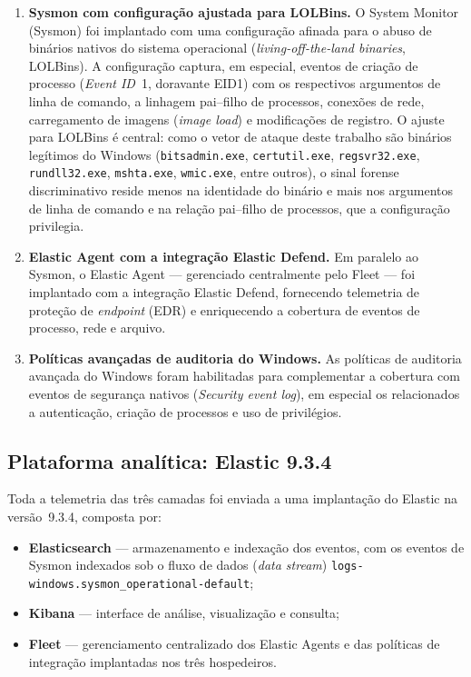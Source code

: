 \begin{enumerate}
    \item \textbf{Sysmon com configuração ajustada para LOLBins.} O System
    Monitor (Sysmon) foi implantado com uma configuração afinada para o abuso
    de binários nativos do sistema operacional (\textit{living-off-the-land
    binaries}, LOLBins). A configuração captura, em especial, eventos de criação
    de processo (\textit{Event ID}~1, doravante EID1) com os respectivos
    argumentos de linha de comando, a linhagem pai--filho de processos, conexões
    de rede, carregamento de imagens (\textit{image load}) e modificações de
    registro. O ajuste para LOLBins é central: como o vetor de ataque deste
    trabalho são binários legítimos do Windows (\texttt{bitsadmin.exe},
    \texttt{certutil.exe}, \texttt{regsvr32.exe}, \texttt{rundll32.exe},
    \texttt{mshta.exe}, \texttt{wmic.exe}, entre outros), o sinal forense
    discriminativo reside menos na identidade do binário e mais nos argumentos de
    linha de comando e na relação pai--filho de processos, que a configuração
    privilegia.
    \item \textbf{Elastic Agent com a integração Elastic Defend.} Em paralelo ao
    Sysmon, o Elastic Agent --- gerenciado centralmente pelo Fleet --- foi
    implantado com a integração Elastic Defend, fornecendo telemetria de
    proteção de \textit{endpoint} (EDR) e enriquecendo a cobertura de eventos de
    processo, rede e arquivo.
    \item \textbf{Políticas avançadas de auditoria do Windows.} As políticas de
    auditoria avançada do Windows foram habilitadas para complementar a cobertura
    com eventos de segurança nativos (\textit{Security event log}), em especial
    os relacionados a autenticação, criação de processos e uso de privilégios.
\end{enumerate}

\subsection{Plataforma analítica: Elastic 9.3.4}

Toda a telemetria das três camadas foi enviada a uma implantação do Elastic na
versão~9.3.4, composta por:

\begin{itemize}
    \item \textbf{Elasticsearch} --- armazenamento e indexação dos eventos, com
    os eventos de Sysmon indexados sob o fluxo de dados (\textit{data stream})
    \texttt{logs-windows.sysmon\_operational-default};
    \item \textbf{Kibana} --- interface de análise, visualização e consulta;
    \item \textbf{Fleet} --- gerenciamento centralizado dos Elastic Agents e das
    políticas de integração implantadas nos três hospedeiros.
\end{itemize}

